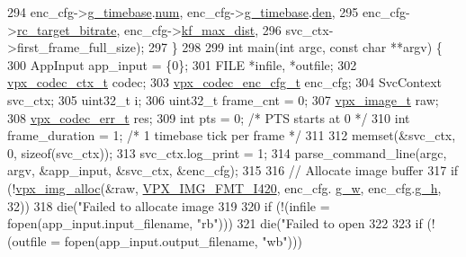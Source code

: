\begin{DoxyCodeInclude}
{{{{{{{{{{{294       enc\_cfg->\hyperlink{structvpx__codec__enc__cfg_a6498d378e4c29ef3e22258289e481087}{g\_timebase}.\hyperlink{structvpx__rational_ae7774f21a22c9bef3aa73156c79f4731}{num}, enc\_cfg->\hyperlink{structvpx__codec__enc__cfg_a6498d378e4c29ef3e22258289e481087}{g\_timebase}.\hyperlink{structvpx__rational_a29dd2ab4001377b3aa21885ef969759f}{den},
295       enc\_cfg->\hyperlink{structvpx__codec__enc__cfg_ab8339685175d66710f482706cc9f0aed}{rc\_target\_bitrate}, enc\_cfg->\hyperlink{structvpx__codec__enc__cfg_ae018440136e271743376730413d25a9b}{kf\_max\_dist},
296       svc\_ctx->first\_frame\_full\_size);
297 \}
298 
299 \textcolor{keywordtype}{int} main(\textcolor{keywordtype}{int} argc, \textcolor{keyword}{const} \textcolor{keywordtype}{char} **argv) \{
300   AppInput app\_input = \{0\};
301   FILE *infile, *outfile;
302   \hyperlink{structvpx__codec__ctx}{vpx\_codec\_ctx\_t} codec;
303   \hyperlink{structvpx__codec__enc__cfg}{vpx\_codec\_enc\_cfg\_t} enc\_cfg;
304   SvcContext svc\_ctx;
305   uint32\_t i;
306   uint32\_t frame\_cnt = 0;
307   \hyperlink{structvpx__image}{vpx\_image\_t} raw;
308   \hyperlink{group__codec_gada1084710837ad363b92f2379dd2b8d2}{vpx\_codec\_err\_t} res;
309   \textcolor{keywordtype}{int} pts = 0;            \textcolor{comment}{/* PTS starts at 0 */}
310   \textcolor{keywordtype}{int} frame\_duration = 1; \textcolor{comment}{/* 1 timebase tick per frame */}
311 
312   memset(&svc\_ctx, 0, \textcolor{keyword}{sizeof}(svc\_ctx));
313   svc\_ctx.log\_print = 1;
314   parse\_command\_line(argc, argv, &app\_input, &svc\_ctx, &enc\_cfg);
315 
316   \textcolor{comment}{// Allocate image buffer}
317   \textcolor{keywordflow}{if} (!\hyperlink{vpx__image_8h_ab80398f28ca880368a922fa979eb66c1}{vpx\_img\_alloc}(&raw, \hyperlink{vpx__image_8h_a7a30a7bff7400fb83ad45fede5077193af17ce49c9a6efd7c8c8ea8928d4ce26c}{VPX\_IMG\_FMT\_I420}, enc\_cfg.
      \hyperlink{structvpx__codec__enc__cfg_a5c165f5b41ca1158f2883983a2b7709c}{g\_w}, enc\_cfg.\hyperlink{structvpx__codec__enc__cfg_a4132bd89ce85bce7c08f2cc3b6f2b82e}{g\_h}, 32))
318     die(\textcolor{stringliteral}{"Failed to allocate image %
319 
320   \textcolor{keywordflow}{if} (!(infile = fopen(app\_input.input\_filename, \textcolor{stringliteral}{"rb"})))
321     die(\textcolor{stringliteral}{"Failed to open %
322 
323   \textcolor{keywordflow}{if} (!(outfile = fopen(app\_input.output\_filename, \textcolor{stringliteral}{"wb"})))
}}}}}}}}}}}}}
\end{DoxyCodeInclude}
